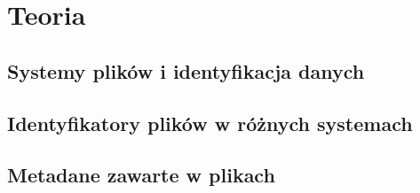 \chapter{Teoria}


\section{Systemy plików i identyfikacja danych}
\label{teoria-systemy-plików}

\section{Identyfikatory plików w różnych systemach}
\label{teoria-identyfikatory}

\section{Metadane zawarte w plikach}
\label{teoria-metadane}


